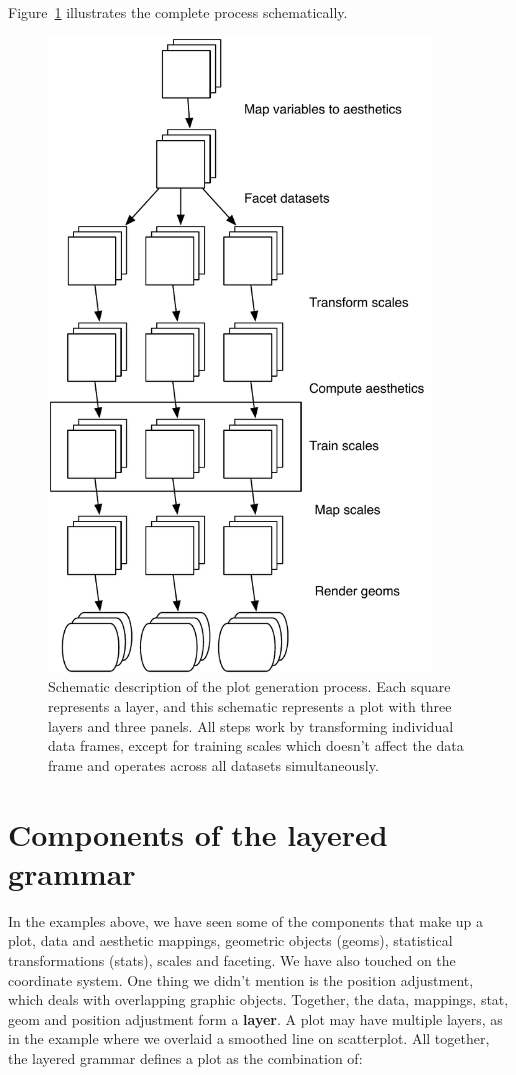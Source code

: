 Figure~\ref{fig:schematic} illustrates the complete process schematically.

\begin{figure}[htbp]
  \centering
  \includegraphics[width=4in]{mastery-schema}
  \caption{Schematic description of the plot generation process. Each square represents a layer, and this schematic represents a plot with three layers and three panels. All steps work by transforming individual data frames, except for training scales which doesn't affect the data frame and operates across all datasets simultaneously.}
  \label{fig:schematic}
\end{figure}

\section{Components of the layered grammar}
\label{sec:components}

In the examples above, we have seen some of the components that make up a plot, data and aesthetic mappings, geometric objects (geoms), statistical transformations (stats), scales and faceting. We have also touched on the coordinate system. One thing we didn't mention is the position adjustment, which deals with overlapping graphic objects. Together, the data, mappings, stat, geom and position adjustment form a {\bf layer}. A plot may have multiple layers, as in the example where we overlaid a smoothed line on scatterplot. All together, the layered grammar defines a plot as the combination of:

